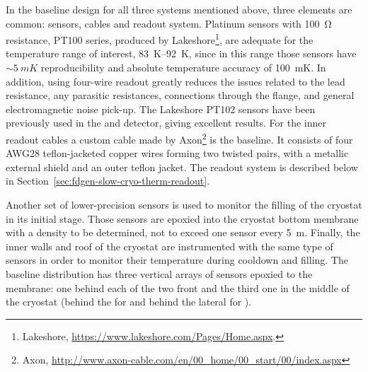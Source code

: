 In the baseline design for all three systems mentioned above, three elements are common: sensors, cables and readout system.
Platinum sensors with \SI{100}{\ohm} resistance, PT100 series, produced by Lakeshore\footnote{Lakeshore\texttrademark{}, \url{https://www.lakeshore.com/Pages/Home.aspx}.},
are adequate for the temperature range of interest, \SIrange{83}{92}{K}, since in this range those sensors have $\sim\SI{5}{mK}$ reproducibility 
 and absolute temperature accuracy of \SI{100}{mK}.
In addition, using four-wire readout greatly reduces the issues related to the lead resistance, any parasitic resistances,
connections through the flange, and general electromagnetic noise pick-up. The Lakeshore PT102 sensors
have been previously used in the  and  detector,
giving excellent results. For the inner readout cables a custom cable made by Axon\footnote{Axon\texttrademark{}, \url{http://www.axon-cable.com/en/00_home/00_start/00/index.aspx}} is the baseline. It consists of four AWG28 teflon-jacketed copper wires forming two twisted pairs, with a metallic external shield
and an outer teflon jacket.
The readout system is described below in  Section~\ref{sec:fdgen-slow-cryo-therm-readout}. %



Another set of lower-precision sensors is used to monitor the filling of the cryostat in its initial stage. Those sensors are epoxied into the cryostat bottom membrane with
a density to be determined, not to exceed one sensor every \SI{5}{m}. 
Finally, the inner walls and roof of the cryostat are instrumented with the same type of sensors in order to monitor their temperature during cooldown and filling.
The baseline distribution has three vertical arrays of sensors epoxied to the membrane: one behind each of the two %
front  and the third one in the middle of the cryostat
(behind the  for \single and behind the lateral %
 for \dual). 

